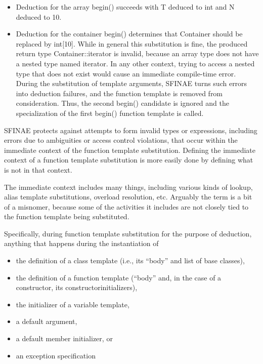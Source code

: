 \begin{itemize}
\item 
Deduction for the array begin() succeeds with T deduced to int and N deduced to 10.

\item 
Deduction for the container begin() determines that Container should be replaced by int[10]. While in general this substitution is fine, the produced return type Container::iterator is invalid, because an array type does not have a nested type named iterator. In any other context, trying to access a nested type that does not exist would cause an immediate compile-time error. During the substitution of template arguments, SFINAE turns such errors into deduction failures, and the function template is removed from consideration. Thus, the second begin() candidate is ignored and the specialization of the first begin() function template is called.
\end{itemize}


SFINAE protects against attempts to form invalid types or expressions, including errors due to ambiguities or access control violations, that occur within the immediate context of the function template substitution. Defining the immediate context of a function template substitution is more easily done by defining what is not in that context.

\begin{tcolorbox}[colback=webgreen!5!white,colframe=webgreen!75!black]
\hspace*{0.75cm}The immediate context includes many things, including various kinds of lookup, alias template substitutions, overload resolution, etc. Arguably the term is a bit of a misnomer, because some of the activities it includes are not closely tied to the function template being substituted.
\end{tcolorbox}

Specifically, during function template substitution for the purpose of deduction, anything that happens during the instantiation of

\begin{itemize}
\item 
the definition of a class template (i.e., its “body” and list of base classes),

\item 
the definition of a function template (“body” and, in the case of a constructor, its constructorinitializers),

\item 
the initializer of a variable template,

\item 
a default argument,

\item 
a default member initializer, or

\item 
an exception specification
\end{itemize}

